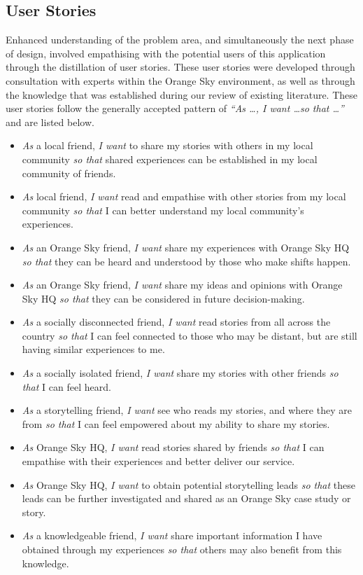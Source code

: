 \subsection{User Stories}

Enhanced understanding of the problem area, and simultaneously the next phase of design, involved empathising with the potential users of this application through the distillation of user stories.
These user stories were developed through consultation with experts within the Orange Sky environment, as well as through the knowledge that was established during our review of existing literature.
These user stories follow the generally accepted pattern of \emph{“As \dots, I want \dots so that \dots”} and are listed below.

\begin{itemize}
    \item \emph{As} a local friend, \emph{I want} to share my stories with others in my local community \emph{so that} shared experiences can be established in my local community of friends.
    \item \emph{As} local friend, \emph{I want} read and empathise with other stories from my local community \emph{so that} I can better understand my local community's experiences.
    \item \emph{As} an Orange Sky friend, \emph{I want} share my experiences with Orange Sky HQ \emph{so that} they can be heard and understood by those who make shifts happen.
    \item \emph{As} an Orange Sky friend, \emph{I want} share my ideas and opinions with Orange Sky HQ \emph{so that} they can be considered in future decision-making.
    \item \emph{As} a socially disconnected friend, \emph{I want} read stories from all across the country \emph{so that} I can feel connected to those who may be distant, but are still having similar experiences to me.
    \item \emph{As} a socially isolated friend, \emph{I want} share my stories with other friends \emph{so that} I can feel heard.
    \item \emph{As} a storytelling friend, \emph{I want} see who reads my stories, and where they are from \emph{so that} I can feel empowered about my ability to share my stories.
    \item \emph{As} Orange Sky HQ, \emph{I want} read stories shared by friends \emph{so that} I can empathise with their experiences and better deliver our service.
    \item \emph{As} Orange Sky HQ, \emph{I want} to obtain potential storytelling leads \emph{so that} these leads can be further investigated and shared as an Orange Sky case study or story.
    \item \emph{As} a knowledgeable friend, \emph{I want} share important information I have obtained through my experiences \emph{so that} others may also benefit from this knowledge.
\end{itemize}

